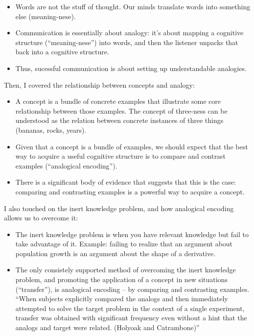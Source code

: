 \begin{itemize}
\itemsep1pt\parskip0pt
\item
  Words are not the stuff of thought. Our minds translate words into
  something else (meaning-nese).
\item
  Communication is essentially about analogy: it's about mapping a
  cognitive structure (``meaning-nese'') into words, and then the
  listener unpacks that back into a cognitive structure.
\item
  Thus, sucessful communication is about setting up understandable
  analogies.
\end{itemize}

Then, I covered the relationship between concepts and analogy:

\begin{itemize}
\itemsep1pt\parskip0pt
\item
  A concept is a bundle of concrete examples that illustrate some core
  relationship between those examples. The concept of three-ness can be
  understood as the relation between concrete instances of three things
  (bananas, rocks, years).
\item
  Given that a concept is a bundle of examples, we should expect that
  the best way to acquire a useful cognitive structure is to compare and
  contrast examples (``analogical encoding'').
\item
  There is a significant body of evidence that suggests that this is the
  case: comparing and contrasting examples is a powerful way to acquire
  a concept.
\end{itemize}

I also touched on the inert knowledge problem, and how analogical
encoding allows us to overcome it:

\begin{itemize}
\itemsep1pt\parskip0pt
\item
  The inert knowledge problem is when you have relevant knowledge but
  fail to take advantage of it. Example: failing to realize that an
  argument about population growth is an argument about the shape of a
  derivative.
\item
  The only consistely supported method of overcoming the inert knowledge
  problem, and promoting the application of a concept in new situations
  (``transfer''), is analogical encoding -- by comparing and contrasting
  examples. ``When subjects explicitly compared the analogs and then
  immediately attempted to solve the target problem in the context of a
  single experiment, transfer was obtained with significant frequency
  even without a hint that the analogs and target were related. (Holyoak
  and Catrambone)''
\end{itemize}

